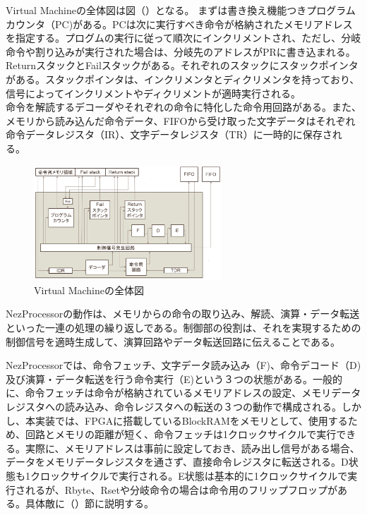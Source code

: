 \documentclass[paper]{ieicej}
\begin{document}
Virtual Machineの全体図は図（）となる。
まずは書き換え機能つきプログラムカウンタ（PC)がある。PCは次に実行すべき命令が格納されたメモリアドレスを指定する。プログムの実行に従って順次にインクリメントされ、ただし、分岐命令や割り込みが実行された場合は、分岐先のアドレスがPRに書き込まれる。\\
ReturnスタックとFailスタックがある。それぞれのスタックにスタックポインタがある。スタックポインタは、インクリメンタとディクリメンタを持っており、信号によってインクリメントやディクリメントが適時実行される。\\
命令を解読するデコーダやそれぞれの命令に特化した命令用回路がある。また、メモリから読み込んだ命令データ、FIFOから受け取った文字データはそれぞれ命令データレジスタ（IR）、文字データレジスタ（TR）に一時的に保存される。

\begin{figure}[h]
    \begin{center}
        \includegraphics[width=70mm]{./fig/circuit}
       \caption{Virtual Machineの全体図 }
    \end{center}
\end{figure}

NezProcessorの動作は、メモリからの命令の取り込み、解読、演算・データ転送といった一連の処理の繰り返しである。制御部の役割は、それを実現するための制御信号を適時生成して、演算回路やデータ転送回路に伝えることである。

NezProcessorでは、命令フェッチ、文字データ読み込み（F)、命令デコード（D)及び演算・データ転送を行う命令実行（E)という３つの状態がある。一般的に、命令フェッチは命令が格納されているメモリアドレスの設定、メモリデータレジスタへの読み込み、命令レジスタへの転送の３つの動作で構成される。しかし、本実装では、FPGAに搭載しているBlockRAMをメモリとして、使用するため、回路とメモリの距離が短く、命令フェッチは1クロックサイクルで実行できる。実際に、メモリアドレスは事前に設定しておき、読み出し信号がある場合、データをメモリデータレジスタを通さず、直接命令レジスタに転送される。D状態も1クロックサイクルで実行される。E状態は基本的に1クロックサイクルで実行されるが、Rbyte、Rsetや分岐命令の場合は命令用のフリップフロップがある。具体敵に（）節に説明する。
\end{document}
